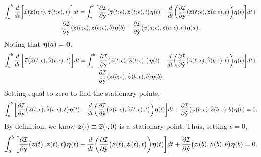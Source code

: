 \documentclass[3p,computermodern,10pt]{elsarticle}
\begin{document}
\begin{appendices}
\begin{multline*}
\int_a^b \frac{d}{d\epsilon}\bigg[ \mathcal{I} \big(\overline{\boldsymbol z}(t;\epsilon),\dot{\overline{\boldsymbol z}}(t;\epsilon) ,t \big) \bigg] dt =  \int_a^b  \bigg[\frac{\partial \mathcal{I}  }{\partial \mathbf{y} } \big(\overline{\boldsymbol z}(t;\epsilon),\dot{\overline{\boldsymbol z}}(t;\epsilon) ,t \big) \boldsymbol \eta(t) - \frac{d}{dt}\bigg( \frac{\partial \mathcal{I}}{\partial \mathbf{\dot{y}} }  \big(\overline{\boldsymbol z}(t;\epsilon),\dot{\overline{\boldsymbol z}}(t;\epsilon) ,t \big) \bigg) \boldsymbol \eta(t) \bigg]dt + \\ \frac{\partial \mathcal{I}}{\partial \mathbf{\dot{y}}} \big(\overline{\boldsymbol z}(b;\epsilon),\dot{\overline{\boldsymbol z}}(b;\epsilon) ,b \big) \boldsymbol \eta(b)  - \frac{\partial \mathcal{I}}{\partial \mathbf{\dot{y}}} \big(\overline{\boldsymbol z}(a;\epsilon),\dot{\overline{\boldsymbol z}}(a;\epsilon) ,a\big) \boldsymbol \eta(a) .
\end{multline*}
Noting that $\boldsymbol \eta(a) = \boldsymbol 0$,
\begin{multline*}
\int_a^b \frac{d}{d\epsilon}\bigg[ \mathcal{I} \big(\overline{\boldsymbol z}(t;\epsilon),\dot{\overline{\boldsymbol z}}(t;\epsilon),t \big) \bigg] dt =  \int_a^b  \bigg[\frac{\partial \mathcal{I}  }{\partial \mathbf{y} } \big(\overline{\boldsymbol z}(t;\epsilon),\dot{\overline{\boldsymbol z}}(t;\epsilon) , \big) \boldsymbol \eta(t) - \frac{d}{dt}\bigg( \frac{\partial \mathcal{I}}{\partial \mathbf{\dot{y}} }  \big(\overline{\boldsymbol z}(t;\epsilon),\dot{\overline{\boldsymbol z}}(t;\epsilon) ,t \big) \bigg) \boldsymbol \eta(t) \bigg]dt + \\ \frac{\partial \mathcal{I}}{\partial \mathbf{\dot{y}}} \big(\overline{\boldsymbol z}(b;\epsilon),\dot{\overline{\boldsymbol z}}(b;\epsilon) ,b \big) \boldsymbol \eta(b) . 
\end{multline*}
Setting equal to zero to find the stationary points,
$$
  \int_a^b  \bigg[\frac{\partial \mathcal{I}  }{\partial \mathbf{y} } \big(\overline{\boldsymbol z}(t;\epsilon),\dot{\overline{\boldsymbol z}}(t;\epsilon),t \big) \boldsymbol \eta(t) - \frac{d}{dt}\bigg( \frac{\partial \mathcal{I}}{\partial \mathbf{\dot{y}} }  \big(\overline{\boldsymbol z}(t;\epsilon),\dot{\overline{\boldsymbol z}}(t;\epsilon),t \big) \bigg) \boldsymbol \eta(t) \bigg]dt + \frac{\partial \mathcal{I}}{\partial \mathbf{\dot{y}}} \big(\overline{\boldsymbol z}(b;\epsilon),\dot{\overline{\boldsymbol z}}(b;\epsilon),b \big) \boldsymbol \eta(b)  = 0. 
$$
By definition, we know $\boldsymbol z(\cdot) \equiv \overline{\boldsymbol z}(\cdot;0)$ is a stationary point. Thus, setting $\epsilon = 0$,
 $$
  \int_a^b  \bigg[\frac{\partial \mathcal{I}  }{\partial \mathbf{y} } \big(\boldsymbol z(t),\dot{\boldsymbol z}(t),t \big) \boldsymbol \eta(t) - \frac{d}{dt}\bigg( \frac{\partial \mathcal{I}}{\partial \mathbf{\dot{y}} }  \big(\boldsymbol z(t),\dot{\boldsymbol z}(t),t \big) \bigg) \boldsymbol \eta(t) \bigg]dt + \frac{\partial \mathcal{I}}{\partial \mathbf{\dot{y}}} \big(\boldsymbol z(b),\dot{\boldsymbol z}(b) ,b\big) \boldsymbol \eta(b)  = 0. 
$$
\end{appendices}
\end{document}
